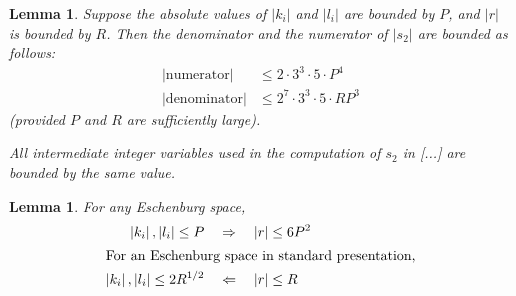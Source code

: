\documentclass{article}
\newtheorem{lem}[thm]{Lemma}
\newcommand{\abs}[1]{\left|#1\right|}
\begin{document}
\begin{lem}\label{lem:s2}
  Suppose the absolute values of \(\abs{k_i}\) and \(\abs{l_i}\) are bounded by \(P\),
  and \(\abs{r}\) is bounded by \(R\). Then  the denominator and the numerator of \(\abs{s_2}\) are bounded as follows:
  \begin{align*}
    \abs{\text{numerator}}   &\leq 2·3^3·5·P^4\\
    \abs{\text{denominator}} &\leq 2^7·3^3·5· R P^3
  \end{align*}
  (provided \(P\) and \(R\) are sufficiently large).

  All intermediate integer variables used in the computation of \(s_2\) in [...] are bounded by the same value. 
\end{lem}
 
\begin{lem}\label{lem:P-vs-R}
  For any Eschenburg space, 
  \begin{align*}
    \abs{k_i}, \abs{l_i} \leq P &\quad\Rightarrow\quad \abs{r} \leq 6 P^2\\
    \intertext{%
    For an Eschenburg space in standard presentation,}
    \abs{k_i}, \abs{l_i} \leq 2R^{1/2} &\quad\Leftarrow\quad \abs{r} \leq R 
  \end{align*}
\end{lem}
\end{document}
